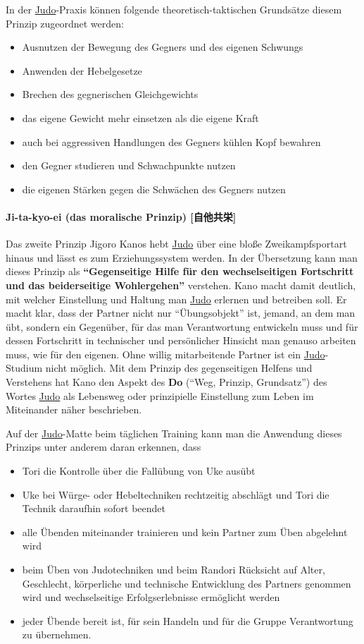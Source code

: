\documentclass[justified, a4paper, notitlepage, captions=tableheading, nobib]{tufte-handout}
\begin{document}
In der \hyperref[org39a3ee2]{Judo}-Praxis können folgende theoretisch-taktischen Grundsätze diesem Prinzip zugeordnet werden: 
\begin{itemize}
\item Ausnutzen der Bewegung des Gegners und des eigenen Schwungs
\item Anwenden der Hebelgesetze
\item Brechen des gegnerischen Gleichgewichts
\item das eigene Gewicht mehr einsetzen als die eigene Kraft
\item auch bei aggressiven Handlungen des Gegners kühlen Kopf bewahren
\item den Gegner studieren und Schwachpunkte nutzen
\item die eigenen Stärken gegen die Schwächen des Gegners nutzen
\end{itemize}

\paragraph{\label{orgc231618}Ji-ta-kyo-ei (das moralische Prinzip) [自他共栄]}
\label{sec:org22c5fd6}
Das zweite Prinzip Jigoro Kanos hebt \hyperref[org39a3ee2]{Judo} über eine bloße Zweikampfsportart hinaus und lässt es zum Erziehungssystem werden. In der Übersetzung kann man dieses Prinzip als \textbf{"`Gegenseitige Hilfe für den wechselseitigen Fortschritt und das beiderseitige Wohlergehen"'} verstehen. Kano macht damit deutlich, mit welcher Einstellung und Haltung man \hyperref[org39a3ee2]{Judo} erlernen und betreiben soll. Er macht klar, dass der Partner nicht nur "`Übungsobjekt"' ist, jemand, an dem man übt, sondern ein Gegenüber, für das man Verantwortung entwickeln muss und für dessen Fortschritt in technischer und persönlicher Hinsicht man genauso arbeiten muss, wie für den eigenen. Ohne willig mitarbeitende Partner ist ein \hyperref[org39a3ee2]{Judo}-Studium nicht möglich. Mit dem Prinzip des gegenseitigen Helfens und Verstehens hat Kano den Aspekt des \textbf{Do} ("`Weg, Prinzip, Grundsatz"') des Wortes \hyperref[org39a3ee2]{Judo} als Lebensweg oder prinzipielle Einstellung zum Leben im Miteinander näher beschrieben. 

Auf der \hyperref[org39a3ee2]{Judo}-Matte beim täglichen Training kann man die Anwendung dieses Prinzips unter anderem daran erkennen, dass 
\begin{itemize}
\item Tori die Kontrolle über die Fallübung von Uke ausübt
\item Uke bei Würge- oder Hebeltechniken rechtzeitig abschlägt und Tori die Technik daraufhin sofort beendet
\item alle Übenden miteinander trainieren und kein Partner zum Üben abgelehnt wird
\item beim Üben von Judotechniken und beim Randori Rücksicht auf Alter, Geschlecht, körperliche und technische  Entwicklung des Partners genommen wird und wechselseitige Erfolgserlebnisse ermöglicht werden
\item jeder Übende bereit ist, für sein Handeln und für die Gruppe Verantwortung zu übernehmen.
\end{itemize}
\end{document}
